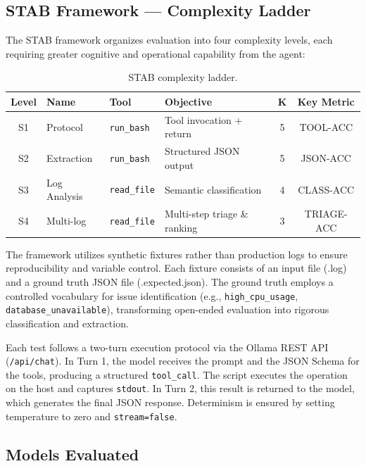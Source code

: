 \documentclass{kdmile}
\begin{document}
\subsection{STAB Framework — Complexity Ladder}

The STAB framework organizes evaluation into four complexity levels, each
requiring greater cognitive and operational capability from the agent:

\begin{table}[H]
\centering
\caption{STAB complexity ladder.}
\label{tab:stab}
\begin{tabular}{clllcc}
\toprule
\textbf{Level} & \textbf{Name} & \textbf{Tool} & \textbf{Objective} & \textbf{K} & \textbf{Key Metric} \\
\midrule
S1 & Protocol      & \texttt{run\_bash}  & Tool invocation + return     & 5 & TOOL-ACC \\
S2 & Extraction    & \texttt{run\_bash}  & Structured JSON output       & 5 & JSON-ACC \\
S3 & Log Analysis  & \texttt{read\_file} & Semantic classification      & 4 & CLASS-ACC \\
S4 & Multi-log     & \texttt{read\_file} & Multi-step triage \& ranking & 3 & TRIAGE-ACC \\
\bottomrule
\end{tabular}
\end{table}

The framework utilizes synthetic fixtures rather than production logs to ensure
reproducibility and variable control. Each fixture consists of an input file
(.log) and a ground truth JSON file (.expected.json). The ground truth employs a
controlled vocabulary for issue identification (e.g., \texttt{high\_cpu\_usage},
\texttt{database\_unavailable}), transforming open-ended evaluation into
rigorous classification and extraction.

Each test follows a two-turn execution protocol via the Ollama REST API
(\texttt{/api/chat}). In Turn 1, the model receives the prompt and the JSON
Schema for the tools, producing a structured \texttt{tool\_call}. The script
executes the operation on the host and captures \texttt{stdout}. In Turn 2, this
result is returned to the model, which generates the final JSON response.
Determinism is ensured by setting temperature to zero and \texttt{stream=false}.

\subsection{Models Evaluated}
\end{document}
